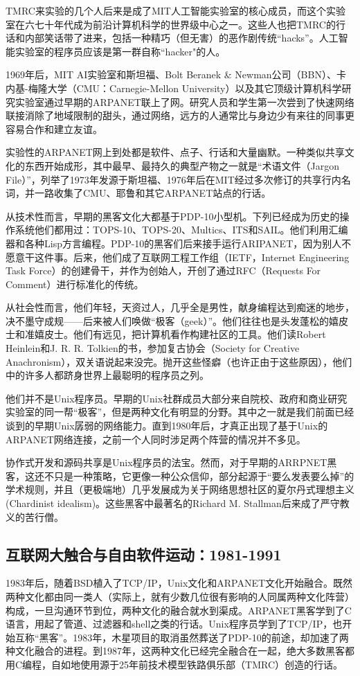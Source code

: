 \documentclass[12pt,oneside]{book}
\begin{document}
TMRC来实验的几个人后来是成了MIT人工智能实验室的核心成员，而这个实验室在六七十年代成为前沿计算机科学的世界级中心之一。这些人也把TMRC的行话和内部笑话带了进来，包括一种精巧（但无害）的恶作剧传统“hacks”。人工智能实验室的程序员应该是第一群自称“hacker"的人。

1969年后，MIT AI实验室和斯坦福、Bolt Beranek \& Newman公司（BBN）、卡内基-梅隆大学（CMU：Carnegie-Mellon University）以及其它顶级计算机科学研究实验室通过早期的ARPANET联上了网。研究人员和学生第一次尝到了快速网络联接消除了地域限制的甜头，通过网络，远方的人通常比与身边少有来往的同事更容易合作和建立友谊。

实验性的ARPANET网上到处都是软件、点子、行话和大量幽默。一种类似共享文化的东西开始成形，其中最早、最持久的典型产物之一就是“术语文件（Jargon File）”，列举了1973年发源于斯坦福、1976年后在MIT经过多次修订的共享行内名词，并一路收集了CMU、耶鲁和其它ARPANET站点的行话。

从技术性而言，早期的黑客文化大都基于PDP-10小型机。下列已经成为历史的操作系统他们都用过：TOPS-10、TOPS-20、Multics、ITS和SAIL。他们利用汇编器和各种Lisp方言编程。PDP-10的黑客们后来接手运行ARIPANET，因为别人不愿意干这件事。后来，他们成了互联网工程工作组（IETF，Internet Engineering Task Force）的创建骨干，并作为创始人，开创了通过RFC（Requests For Comment）进行标准化的传统。

从社会性而言，他们年轻，天资过人，几乎全是男性，献身编程达到痴迷的地步，决不墨守成规——后来被人们唤做“极客（geek）”。他们往往也是头发蓬松的嬉皮士和准嬉皮士。他们有远见，把计算机看作构建社区的工具。他们读Robert Heinlein和J. R. R. Tolkien的书，参加复古协会（Society for Creative Anachronism），双关语说起来没完。抛开这些怪癖（也许正由于这些原因），他们中的许多人都跻身世界上最聪明的程序员之列。

他们并不是Unix程序员。早期的Unix社群成员大部分来自院校、政府和商业研究实验室的同一帮“极客”，但是两种文化有明显的分野。其中之一就是我们前面已经谈到的早期Unix孱弱的网络能力。直到1980年后，才真正出现了基于Unix的ARPANET网络连接，之前一个人同时涉足两个阵营的情况并不多见。

协作式开发和源码共享是Unix程序员的法宝。然而，对于早期的ARRPNET黑客，这还不只是一种策略，它更像一种公众信仰，部分起源于“要么发表要么掉”的学术规则，并且（更极端地）几乎发展成为关于网络思想社区的夏尔丹式理想主义(Chardinist idealism)。这些黑客中最著名的Richard M. Stallman后来成了严守教义的苦行僧。

\subsection{互联网大触合与自由软件运动：1981-1991}
1983年后，随着BSD植入了TCP/IP，Unix文化和ARPANET文化开始融合。既然两种文化都由同一类人（实际上，就有少数几位很有影响的人同属两种文化阵营）构成，一旦沟通环节到位，两种文化的融合就水到渠成。ARPANET黑客学到了C语言，用起了管道、过滤器和shell之类的行话。Unix程序员学到了TCP/IP，也开始互称“黑客”。1983年，木星项目的取消虽然葬送了PDP-10的前途，却加速了两种文化融合的进程。到1987年，这两种文化已经完全融合在一起，绝大多数黑客都用C编程，自如地使用源于25年前技术模型铁路俱乐部（TMRC）创造的行话。
\end{document}
